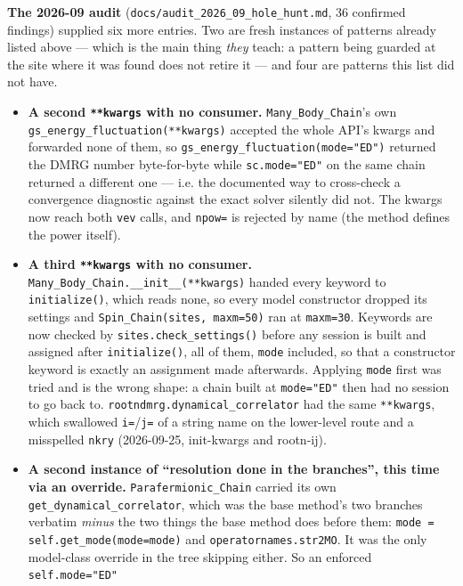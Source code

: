 \documentclass[11pt]{article}
\begin{document}
\textbf{The 2026-09 audit}
(\texttt{docs/audit\_2026\_09\_hole\_hunt.md}, 36 confirmed findings)
supplied six more entries. Two are fresh instances of patterns already
listed above --- which is the main thing \emph{they} teach: a pattern
being guarded at the site where it was found does not retire it --- and
four are patterns this list did not have.

\begin{itemize}
  \item \textbf{A second \texttt{**kwargs} with no consumer.}
    \texttt{Many\_Body\_Chain}'s own
    \texttt{gs\_energy\_fluctuation(**kwargs)} accepted the whole API's
    kwargs and forwarded none of them, so
    \texttt{gs\_energy\_fluctuation(mode="ED")} returned the DMRG number
    byte-for-byte while \texttt{sc.mode="ED"} on the same chain returned
    a different one --- i.e. the documented way to cross-check a
    convergence diagnostic against the exact solver silently did not. The
    kwargs now reach both \texttt{vev} calls, and \texttt{npow=} is
    rejected by name (the method defines the power itself).
  \item \textbf{A third \texttt{**kwargs} with no consumer.}
    \texttt{Many\_Body\_Chain.\_\_init\_\_(**kwargs)} handed every keyword
    to \texttt{initialize()}, which reads none, so every model
    constructor dropped its settings and
    \texttt{Spin\_Chain(sites, maxm=50)} ran at \texttt{maxm=30}.
    Keywords are now checked by \texttt{sites.check\_settings()} before
    any session is built and assigned after \texttt{initialize()}, all of
    them, \texttt{mode} included, so that a constructor keyword is
    exactly an assignment made afterwards. Applying \texttt{mode} first
    was tried and is the wrong shape: a chain built at
    \texttt{mode="ED"} then had no session to go back to.
    \texttt{rootndmrg.dynamical\_correlator} had the same
    \texttt{**kwargs}, which swallowed \texttt{i=}/\texttt{j=} of a string
    name on the lower-level route and a misspelled \texttt{nkry}
    (2026-09-25, init-kwargs and rootn-ij).
  \item \textbf{A second instance of ``resolution done in the
    branches'', this time via an override.}
    \texttt{Parafermionic\_Chain} carried its own
    \texttt{get\_dynamical\_correlator}, which was the base method's two
    branches verbatim \emph{minus} the two things the base method does
    before them: \texttt{mode = self.get\_mode(mode=mode)} and
    \texttt{operatornames.str2MO}. It was the only model-class override
    in the tree skipping either. So an enforced \texttt{self.mode="ED"}

\end{itemize}
\end{document}
